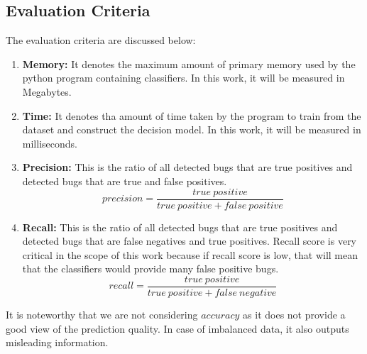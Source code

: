 \documentclass[sigplan]{acmart}\settopmatter{printfolios=true,printccs=false,printacmref=false}
\begin{document}
\subsection{Evaluation Criteria}
The evaluation criteria are discussed below:
\begin{enumerate}
	\item \textbf{Memory: } It denotes the maximum amount of primary memory used by the python program containing classifiers. In this work, it will be measured in Megabytes.
	\item \textbf{Time: } It denotes tha amount of time taken by the program to train from the dataset and construct the decision model. In this work, it will be measured in milliseconds.
	\item \textbf{Precision: } This is the ratio of all detected bugs that are true positives and detected bugs that are true and false positives.
	\begin{equation}
	precision = \frac{true \ positive}{true\ positive + false \ positive}
	\end{equation}
	\item \textbf{Recall: } This is the ratio of all detected bugs that are true positives and detected bugs that are false negatives and true positives. Recall score is very critical in the scope of this work because if recall score is low, that will mean that the classifiers would provide many false positive bugs.
	\begin{equation}
	recall = \frac{true \ positive}{true \ positive + false \ negative}
	\end{equation}
\end{enumerate}

It is noteworthy that we are not considering $accuracy$ as it does not provide a good view of the prediction quality. In case of imbalanced data, it also outputs misleading information.
\end{document}
